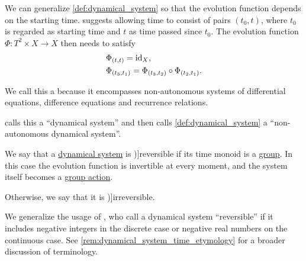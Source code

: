 \begin{definition}\label{def:non_autonomous_dynamical_system}\mimprovised
  We can generalize \cref{def:dynamical_system} so that the evolution function depends on the starting time.  suggests allowing time to consist of pairs \( (t_0, t) \), where \( t_0 \) is regarded as starting time and \( t \) as time passed since \( t_0 \). The evolution function \( \Phi: T^2 \times X \to X \) then needs to satisfy
  \begin{align}
    &\Phi_{(t, t)} = \id_X,                                            \label{eq:def:non_autonomous_dynamical_system/identity} \\
    &\Phi_{(t_3, t_1)} = \Phi_{(t_3, t_2)} \bincirc \Phi_{(t_2, t_1)}. \label{eq:def:non_autonomous_dynamical_system/compatibility}
  \end{align}

  We call this a  because it encompasses non-autonomous systems of differential equations, difference equations and recurrence relations.
\end{definition}
\begin{comments}
  \item {} calls this a \enquote{dynamical system} and then calls \cref{def:dynamical_system} a \enquote{non-autonomous dynamical system}.
\end{comments}

\begin{definition}\label{def:reversible_dynamical_system}\mimprovised
  We say that a \hyperref[def:dynamical_system]{dynamical system} is \term[en=reversible (\cite[1]{HasselblattKatok1995DynamicalSystems})]{reversible} if its time monoid is a \hyperref[def:group]{group}. In this case the evolution function is invertible at every moment, and the system itself becomes a \hyperref[def:group_action]{group action}.

  Otherwise, we say that it is \term[en=irreversible (\cite[1]{HasselblattKatok1995DynamicalSystems})]{irreversible}.
\end{definition}
\begin{comments}
  \item We generalize the usage of , who call a dynamical system \enquote{reversible} if it includes negative integers in the discrete case or negative real numbers on the continuous case. See \cref{rem:dynamical_system_time_etymology} for a broader discussion of terminology.
\end{comments}


